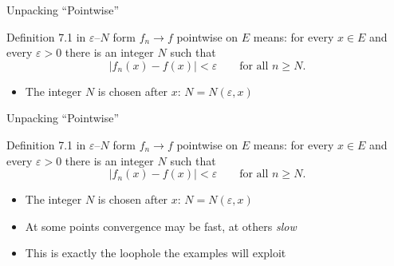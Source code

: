 \documentclass[aspectratio=169,12pt,t]{beamer}
\begin{document}
{%
\begin{frame}{Unpacking ``Pointwise''}
  \begin{remblock}{Definition 7.1 in $\varepsilon$--$N$ form}
    $f_n \to f$ pointwise on $E$ means: for every $x \in E$ and every
    $\varepsilon > 0$ there is an integer $N$ such that
    \[
      |f_n(x) - f(x)| < \varepsilon \qquad \text{for all } n \geq N.
    \]
  \end{remblock}
  \begin{hlbox}

  \vspace{0.6em}
  \begin{itemize}
    \item The integer $N$ is chosen \alert{after} $x$: $N = N(\varepsilon, x)$
  \end{itemize}
  \end{hlbox}

\end{frame}

\begin{frame}{Unpacking ``Pointwise''}
  \begin{remblock}{Definition 7.1 in $\varepsilon$--$N$ form}
    $f_n \to f$ pointwise on $E$ means: for every $x \in E$ and every
    $\varepsilon > 0$ there is an integer $N$ such that
    \[
      |f_n(x) - f(x)| < \varepsilon \qquad \text{for all } n \geq N.
    \]
  \end{remblock}
  \begin{hlbox}

  \vspace{0.6em}
  \begin{itemize}
    \item The integer $N$ is chosen \alert{after} $x$: $N = N(\varepsilon, x)$
    \item At some points convergence may be fast, at others \emph{slow}
    \item This is exactly the loophole the examples will exploit
  \end{itemize}
  \end{hlbox}


\end{frame}}
\end{document}
